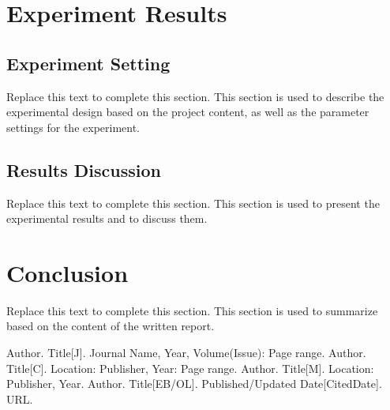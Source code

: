 \documentclass[a4paper, utk8]{ctexart}
\begin{document}
    \section{Experiment Results}
    
    \subsection{Experiment Setting}
    
    Replace this text to complete this section. This section is used to describe the experimental design based on the project content, as well as the parameter settings for the experiment.
    
    \subsection{Results Discussion}
    
    Replace this text to complete this section. This section is used to present the experimental results and to discuss them.
    
    \section{Conclusion}
    
    Replace this text to complete this section. This section is used to summarize based on the content of the written report.

    \let\cleardoublepage\clearpage

    \begin{thebibliography}{99}  
	Author. Title[J]. Journal Name, Year, Volume(Issue): Page range.
	Author. Title[C]. Location: Publisher, Year: Page range.
	Author. Title[M]. Location: Publisher, Year.
	Author. Title[EB/OL]. Published/Updated Date[CitedDate]. URL.
    \end{thebibliography}
\end{document}
